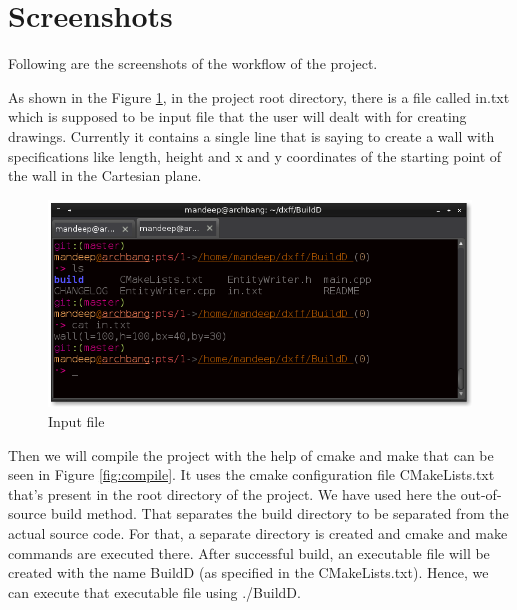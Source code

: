 \section{Screenshots}

Following are the screenshots of the workflow of the project.

\noindent As shown in the Figure \ref{fig:input}, in the project root directory, there is a file called in.txt which is supposed to be input file that the user will dealt with for creating drawings. Currently it contains a single line that is saying to create a wall with specifications like length, height and x and y coordinates of the starting point of the wall in the Cartesian plane.\\

\begin{figure}
\centering
\includegraphics[scale=0.5]{images/bld0.png}
\caption{Input file}
\label{fig:input}
\end{figure}

\noindent Then we will compile the project with the help of cmake and make that can be seen in Figure \ref{fig:compile}. It uses the cmake configuration file CMakeLists.txt that's present in the root directory of the project. We have used here the out-of-source build method. That separates the build directory to be separated from the actual source code. For that, a separate directory is created and cmake and make commands are executed there.
After successful build, an executable file will be created with the name BuildD (as specified in the CMakeLists.txt). Hence, we can execute that executable file using ./BuildD.\\

